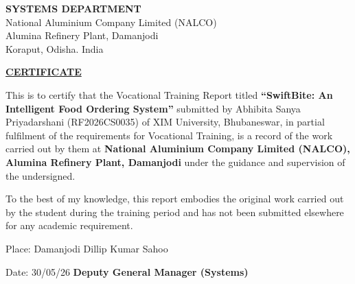 \begin{center}

\vspace*{0.5in}

\textbf{SYSTEMS DEPARTMENT} \\
National Aluminium Company Limited (NALCO) \\
Alumina Refinery Plant, Damanjodi\\
Koraput, Odisha. India

\vspace{1cm}

\textbf{\underline{CERTIFICATE}}

\end{center}

\begin{doublespace}

{ This is to certify that the Vocational Training Report titled \textbf{``SwiftBite: An Intelligent Food Ordering System''} submitted by  Abhibita Sanya Priyadarshani (RF2026CS0035) 
of XIM University, Bhubaneswar, in partial fulfilment of the requirements for Vocational Training, is a record of the work carried out by them at \textbf{National Aluminium Company Limited (NALCO), Alumina Refinery Plant, Damanjodi} under the guidance and supervision of the undersigned.}

To the best of my knowledge, this report embodies the original work carried out by the student during the training period and has not been submitted elsewhere for any academic requirement.

\vspace{1.5cm}

\begin{flushleft}
Place: Damanjodi
\hfill
Dillip Kumar Sahoo
\end{flushleft}

\begin{flushleft}
Date: 30/05/26
\hfill
\textbf{Deputy General Manager (Systems)}
\end{flushleft}

\end{doublespace}